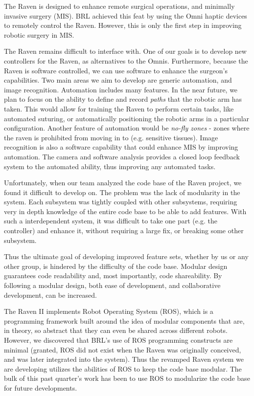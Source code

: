 \documentclass[letterpaper,twocolumn,10pt]{article}
\begin{document}
The Raven is designed to enhance remote surgical operations, and 
minimally invasive surgery (MIS). BRL achieved this feat by using the 
Omni haptic devices to remotely control the Raven. However, this is 
only the first step in improving robotic surgery in MIS.

The Raven remains difficult to interface with. One of our goals is to 
develop new controllers for the Raven, as alternatives to the Omnis. 
Furthermore, because the Raven is software controlled, we can use 
software to enhance the surgeon's capabilities. Two main areas we 
aim to develop are generic automation, and image recognition. 
Automation includes many features. In the near future, we plan to 
focus on the ability to define and record \emph{paths} that the 
robotic arm has taken. This would allow for training the Raven to 
perform certain tasks, like automated suturing, or automatically 
positioning the robotic arms in a particular configuration. Another 
feature of automation would be \emph{no-fly zones} - zones where 
the raven is prohibited from moving in to (e.g. sensitive tissues). 
Image recognition is also a software capability that could enhance 
MIS by improving automation. The camera and software analysis provides 
a closed loop feedback system to the automated ability, thus improving 
any automated tasks.

Unfortunately, when our team analyzed the code base of the Raven 
project, we found it difficult to develop on. The problem was the lack 
of modularity in the system. Each subsystem was tightly coupled with 
other subsystems, requiring very in depth knowledge of the entire 
code base to be able to add features. With such a interdependent 
system, it was difficult to take one part (e.g. the controller) and 
enhance it, without requiring a large fix, or breaking some other 
subsystem.

Thus the ultimate goal of developing improved feature sets, whether 
by us or any other group, is hindered by the difficulty of the code 
base. Modular design guarantees code readability
and, most importantly, code shareability. By following a modular 
design, both ease of development, and collaborative development, can 
be increased.

The Raven II implements
Robot Operating System (ROS), which is a programming framework built
around the idea of modular components that are, in theory, so abstract
that they can even be shared across different robots. However, we
discovered that BRL's use of ROS programming constructs are minimal
(granted, ROS did not exist when the Raven was originally conceived,
and was later integrated into the system). Thus the revamped Raven 
system we are developing utilizes the abilities of ROS to keep the 
code base modular. The bulk of this past quarter's work has been to 
use ROS to modularize the code base for future developments.
\end{document}
